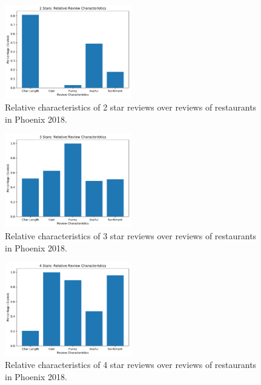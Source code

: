 \begin{figure}[h]
    \centering
    \includegraphics[width=0.49\textwidth]{img/phoenix2018/2Stars.pdf}
    \caption{Relative characteristics of 2 star reviews over reviews of restaurants in Phoenix 2018.}
    \label{fig:2star}
\end{figure}

\begin{figure}[h]
    \centering
    \includegraphics[width=0.49\textwidth]{img/phoenix2018/3Stars.pdf}
    \caption{Relative characteristics of 3 star reviews over reviews of restaurants in Phoenix 2018.}
    \label{fig:3star}
\end{figure}

\begin{figure}[h]
    \centering
    \includegraphics[width=0.49\textwidth]{img/phoenix2018/4Stars.pdf}
    \caption{Relative characteristics of 4 star reviews over reviews of restaurants in Phoenix 2018.}
    \label{fig:4star}
\end{figure}

